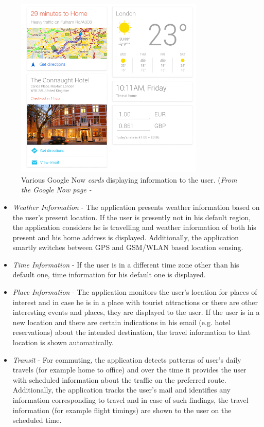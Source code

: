 \documentclass[12pt]{report}
\begin{document}
\begin{figure}[htbp]
 \centering
 \includegraphics[width=90mm]{GoogleNow.png}
  \caption[Various Google Now \textit{cards} displaying information to the user.]{Various Google Now \textit{cards} displaying information to the user. (\textit{From the Google Now page - \cite{google2014app}}}
 \label{figure:GoogleNow}
\end{figure}

\begin{itemize}
\item \textit{Weather Information} - The application presents weather information based on the user's present location. If the user is presently not in his default region, the application considers he is travelling and weather information of both his present and his home address is displayed. Additionally, the application smartly switches between GPS and GSM/WLAN based location sensing.

\item \textit{Time Information} - If the user is in a different time zone other than his default one, time information for his default one is displayed.

\item \textit{Place Information} - The application monitors the user's location for places of interest and in case he is in a place with tourist attractions or there are other interesting events and places, they are displayed to the user. If the user is in a new location and there are certain indications in his email (e.g. hotel reservations) about the intended destination, the travel information to that location is shown automatically.

\item \textit{Transit} - For commuting, the application detects patterns of user's daily travels (for example home to office) and over the time it provides the user with scheduled information about the traffic on the preferred route. Additionally, the application tracks the user's mail and identifies any information corresponding to travel and in case of such findings, the travel information (for example flight timings) are shown to the user on the scheduled time.
\end{itemize}
\end{document}
